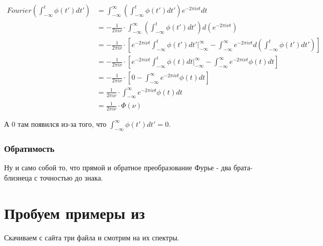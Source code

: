\documentclass[a4paper,12pt]{report}
\begin{document}
    \[
        \begin{aligned}
            Fourier\left(\int_{-\infty}^{t} \phi(t') dt'\right) 
            &= \int_{-\infty}^{\infty} \left( \int_{-\infty}^{t} \phi(t') dt' \right) e^{-2\pi i\nu t} dt \\
            &= -\frac{1}{2\pi i\nu} \cdot \int_{-\infty}^{\infty} \left( \int_{-\infty}^{t} \phi(t') dt' \right) d\left(e^{-2\pi i\nu t}\right) \\
            &= -\frac{1}{2\pi i\nu} \cdot \left[ e^{-2\pi i\nu t} \int_{-\infty}^{t} \phi(t') dt' \biggr|_{-\infty}^{\infty} - \int_{-\infty}^{\infty} e^{-2\pi i\nu t} d\left(\int_{-\infty}^{t} \phi(t') dt'\right)\right] \\
            &= -\frac{1}{2\pi i\nu} \cdot \left[ e^{-2\pi i\nu t} \int_{-\infty}^{t} \phi(t) dt \biggr|_{-\infty}^{\infty} - \int_{-\infty}^{\infty} e^{-2\pi i\nu t} \phi(t) dt\right] \\
            &= -\frac{1}{2\pi i\nu} \cdot \left[ 0 - \int_{-\infty}^{\infty} e^{-2\pi i\nu t} \phi(t) dt\right] \\
            &= \frac{1}{2\pi i\nu} \cdot \int_{-\infty}^{\infty} e^{-2\pi i\nu t} \phi(t) dt \\
            &= \frac{1}{2\pi i\nu} \cdot \Phi(\nu)
        \end{aligned}
    \]
    
    А 0 там появился из-за того, что $\int_{-\infty}^{\infty} \phi(t') dt' = 0$.
    
    \subsection{Обратимость}
    
    Ну и само собой то, что прямой и обратное преобразование Фурье - два брата-близнеца с точностью до знака.
    
    \chapter{Пробуем примеры из }
    
    Скачиваем с сайта три файла и смотрим на их спектры.
    
\end{document}
